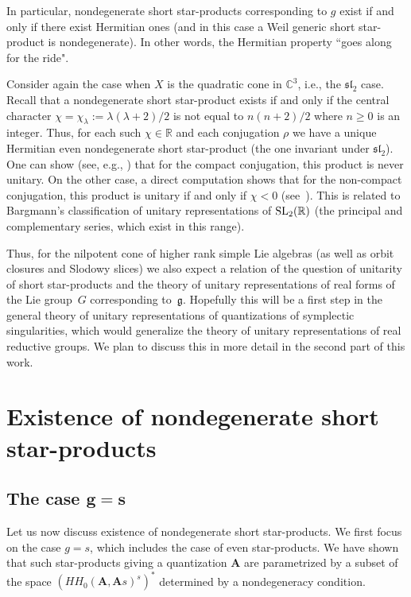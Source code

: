 \documentclass[pdftex]{sigma}
\numberwithin{equation}{section}
\newcommand{\g}{\mathfrak{g}}
\begin{document}
In particular, nondegenerate short star-products corresponding to $g$ exist if and only if there exist Hermitian ones (and in this case a Weil generic short star-product is nondegenerate). In other words, the Hermitian property ``goes along for the ride".

\begin{Example} Consider again the case when $X$ is the quadratic cone in ${\mathbb C}^3$, i.e., the $\mathfrak{sl}_2$ case. Recall that a nondegenerate short star-product exists if and only if the central character $\chi=\chi_\lambda:=\lambda(\lambda+2)/2$ is not equal to $n(n+2)/2$ where $n\ge 0$ is an integer.
Thus, for each such $\chi\in {\mathbb R}$ and each conjugation $\rho$ we have a unique Hermitian
even nondegenerate short star-product (the one invariant under $\mathfrak{sl}_2$).
One can show (see, e.g., \cite{BPR}) that for the compact conjugation, this product is never unitary.
On the other case, a direct computation shows that for the non-compact conjugation, this product is unitary
if and only if $\chi<0$ (see~\cite[Section~5.1]{BPR}). This is related to Bargmann's classification of unitary representations of ${\rm SL}_2({\mathbb R})$ (the principal and complementary series, which exist in this range).

Thus, for the nilpotent cone of higher rank simple Lie algebras (as well as orbit closures and Slodowy slices) we also expect a relation of the question of unitarity of short star-products and the theory of unitary representations of real forms of the Lie group~$G$ corresponding to~$\g$. Hopefully this will be a first step in the general theory of unitary representations of quantizations of symplectic singularities, which would generalize the theory of unitary representations of real reductive groups. We plan to discuss this in more detail in the second part of this work.
\end{Example}

\section{Existence of nondegenerate short star-products}\label{section4}

\subsection[The case $g=s$]{The case $\boldsymbol{g=s}$}

Let us now discuss existence of nondegenerate short star-products. We first focus on the case $g=s$, which includes the case of even star-products. We have shown that such star-products giving a quantization ${\mathbf A}$ are parametrized by a subset of the space $(HH_0({\mathbf A},{\mathbf A}s)^s)^*$ determined by a nondegeneracy condition.
\end{document}

